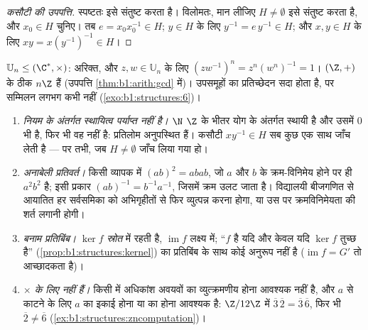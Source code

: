 \begin{proof}[कसौटी की उपपत्ति]
 स्पष्टतः इसे संतुष्ट करता है। विलोमतः, मान लीजिए $H \neq \emptyset$
इसे संतुष्ट करता है, और $x_0 \in H$ चुनिए। तब $e = x_0 x_0^{-1} \in H$; $y
\in H$ के लिए $y^{-1} = e\,y^{-1} \in H$; और $x, y \in H$ के लिए $xy = x
(y^{-1})^{-1} \in H$।
\end{proof}

\begin{example}\label{ex:b1:structures:subgroups}
$\mathbb{U}_n \leq (\C^*, \times)$: अरिक्त, और $z, w \in \mathbb{U}_n$ के
लिए $(zw^{-1})^n = z^n (w^n)^{-1} = 1$। $(\Z, +)$ के  ठीक $n\Z$ हैं
(उपपत्ति \cref{thm:b1:arith:gcd} में)। उपसमूहों का प्रतिच्छेदन सदा 
होता है, पर सम्मिलन लगभग कभी नहीं (\cref{exo:b1:structures:6})।
\end{example}

\begin{remark}[संरचनाओं की सामान्य भूलें]\label{rem:b1:structures:pitfalls}
\begin{enumerate}
  \item \emph{नियम के अंतर्गत स्थायित्व पर्याप्त नहीं है।} $\N$ $\Z$ के भीतर
  योग के अंतर्गत स्थायी है और उसमें $0$ भी है, फिर भी वह  नहीं है:
  प्रतिलोम अनुपस्थित हैं। कसौटी $xy^{-1} \in H$ सब कुछ एक साथ जाँच लेती है
  --- पर तभी, जब $H \neq \emptyset$ जाँच लिया गया हो।
  \item \emph{अनाबेली प्रतिवर्त।} किसी व्यापक  में $(ab)^2 = abab$, जो
  $a$ और $b$ के क्रम-विनिमेय होने पर ही $a^2b^2$ है; इसी प्रकार $(ab)^{-1} =
  b^{-1}a^{-1}$, जिसमें क्रम उलट जाता है। विद्यालयी बीजगणित से आयातित हर
  सर्वसमिका को अभिगृहीतों से फिर व्युत्पन्न करना होगा, या उस पर
  क्रमविनिमेयता की शर्त लगानी होगी।
  \item \emph{ बनाम प्रतिबिंब।} $\ker f$ \emph{स्रोत} में रहती है,
  $\operatorname{im} f$ लक्ष्य में; ``$f$  है यदि और केवल यदि $\ker f$
  तुच्छ है'' (\cref{prop:b1:structures:kernel}) का प्रतिबिंब के साथ कोई
  अनुरूप नहीं है ($\operatorname{im} f = G'$ तो आच्छादकता है)।
  \item \emph{ $\times$ के लिए  नहीं हैं।} किसी  में अधिकांश
  अवयवों का व्युत्क्रमणीय होना आवश्यक नहीं है, और $a$ से काटने के लिए $a$ का
  इकाई होना या  का  होना आवश्यक है: $\Z/12\Z$ में
  $\overline3\,\overline2 = \overline3\,\overline6$, फिर भी $\overline2 \neq
  \overline6$ (\cref{ex:b1:structures:zncomputation})।
\end{enumerate}
\end{remark}

